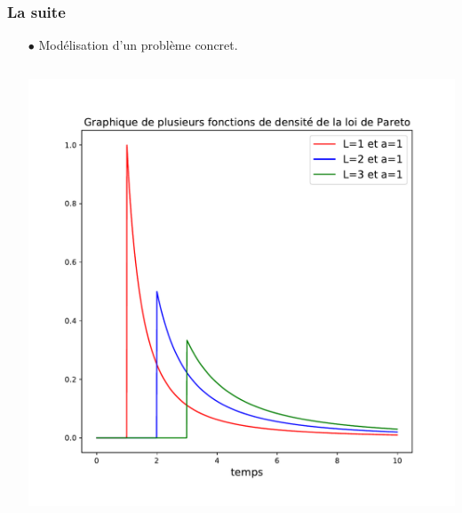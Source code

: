 \documentclass[8pt, sans]{beamer}
\begin{document}
\begin{frame}

\frametitle{La suite }

\pause
\vfill

\begin{itemize}

\item[$\bullet$]
Modélisation d'un problème concret.

\begin{columns}[T] %

\begin{column}{0.5\linewidth}
\includegraphics[scale=0.25]{graphiques_Pareto-temps.pdf}
\end{column}%

\hfill
\pause


\end{columns}
\end{itemize}
\end{frame}
\end{document}
